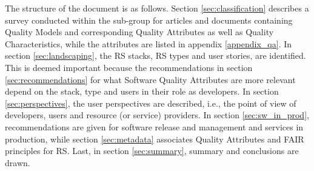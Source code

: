The structure of the document is as follows. Section \ref{sec:classification} describes a survey conducted within the sub-group for articles and documents containing Quality Models and corresponding Quality Attributes as well as Quality Characteristics, while the attributes are listed in appendix \ref{appendix_qa}. In section \ref{sec:landscaping}, the RS stacks, RS types and user stories, are identified. This is deemed important because the recommendations in section \ref{sec:recommendations} for what Software Quality Attributes are more relevant depend on the stack, type and users in their role as developers. In section \ref{sec:perspectives}, the user perspectives are described, i.e., the point of view of developers, users and resource (or service) providers. In section \ref{sec:sw_in_prod}, recommendations are given for software release and management and services in production, while section \ref{sec:metadata} associates Quality Attributes and FAIR principles for RS. Last, in section \ref{sec:summary}, summary and conclusions are drawn.
